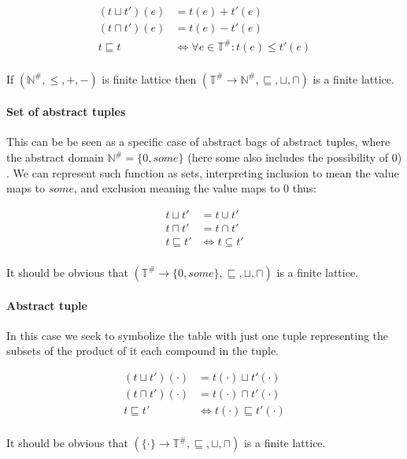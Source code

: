 \begin{align*}
    (t \sqcup t')(e) &= t(e) + t'(e) \\
    (t \sqcap t')(e) &= t(e) - t'(e) \\
    t \sqsubseteq t &\iff \forall e \in \mathbb{T}^\# : t(e) \leq t'(e) \\
\end{align*}

If $(\mathbb{N}^\#, \leq, +, -)$ is finite lattice then $(\mathbb{T}^\# \rightarrow \mathbb{N}^\#, \sqsubseteq, \sqcup, \sqcap)$ is a finite lattice.

\paragraph{Set of abstract tuples}

This can be be seen as a specific case of abstract bags of abstract tuples, where the abstract domain $\mathbb{N}^\# = \{0, some\}$ (here some also includes the possibility of $0$) .
We can represent such function as sets, interpreting inclusion to mean the value maps to $some$, and exclusion meaning the value maps to $0$ thus:

\begin{align*}
    t \sqcup t' &= t \cup t' \\
    t \sqcap t' &= t \cap t' \\
    t \sqsubseteq t' &\iff t \subseteq t' \\
\end{align*}

It should be obvious that $(\mathbb{T}^\# \rightarrow \{0, some\}, \sqsubseteq, \sqcup, \sqcap)$ is a finite lattice.

\paragraph{Abstract tuple}

In this case we seek to symbolize the table with just one tuple representing the subsets of the product of it each compound in the tuple.

\begin{align*}
    (t \sqcup t')(\cdot) &= t(\cdot) \sqcup t'(\cdot) \\
    (t \sqcap t')(\cdot) &= t(\cdot) \sqcap t'(\cdot) \\
    t \sqsubseteq t' &\iff t(\cdot) \sqsubseteq t'(\cdot) \\
\end{align*}

It should be obvious that $(\{\cdot\} \rightarrow \mathbb{T}^\#, \sqsubseteq, \sqcup, \sqcap)$ is a finite lattice.
